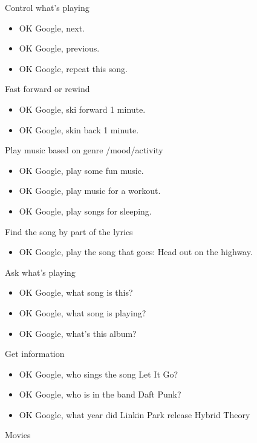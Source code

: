 \documentclass[
  a4paper,
]{article}
\providecommand{\tightlist}{%
  \setlength{\itemsep}{0pt}\setlength{\parskip}{0pt}}\usepackage{longtable,booktabs,array}
\begin{document}
Control what's playing

\begin{itemize}
\item
  OK Google, next.
\item
  OK Google, previous.
\item
  OK Google, repeat this song.
\end{itemize}

Fast forward or rewind

\begin{itemize}
\item
  OK Google, ski forward 1 minute.
\item
  OK Google, skin back 1 minute.
\end{itemize}

Play music based on genre /mood/activity

\begin{itemize}
\item
  OK Google, play some fun music.
\item
  OK Google, play music for a workout.
\item
  OK Google, play songs for sleeping.
\end{itemize}

Find the song by part of the lyrics

\begin{itemize}
\tightlist
\item
  OK Google, play the song that goes: Head out on the highway.
\end{itemize}

Ask what's playing

\begin{itemize}
\item
  OK Google, what song is this?
\item
  OK Google, what song is playing?
\item
  OK Google, what's this album?
\end{itemize}

Get information

\begin{itemize}
\item
  OK Google, who sings the song Let It Go?
\item
  OK Google, who is in the band Daft Punk?
\item
  OK Google, what year did Linkin Park release Hybrid Theory
\end{itemize}

Movies
\end{document}
